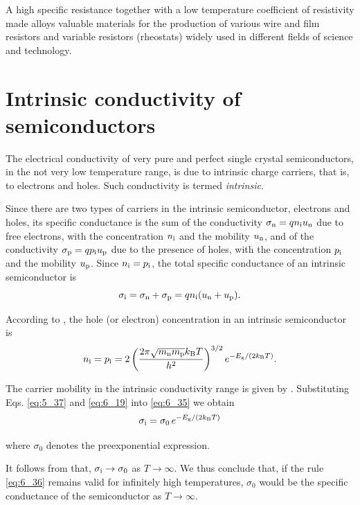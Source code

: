 A high specific resistance together with a low temperature coefficient of resistivity made alloys valuable materials for the production of various wire and film resistors and variable resistors (rheostats) widely used in different fields of science and technology.

\section{Intrinsic conductivity of semiconductors}\label{sec:56}

The electrical conductivity of very pure and perfect single crystal semiconductors, in the not very low temperature range, is due to intrinsic charge carriers, that is, to electrons and holes. Such conductivity is termed \textit{intrinsic}.

Since there are two types of carriers in the intrinsic semiconductor, electrons and holes, its specific conductance is the sum of the conductivity $\sigma_{\text{n}}=qn_{\text{i}}u_{\text{n}}$ due to free electrons, with the concentration $n_{\text{i}}$ and the mobility $u_{\text{n}}$, and of the conductivity $\sigma_{\text{p}}=qp_{\text{i}}u_{\text{p}}$ due to
the presence of holes, with the concentration $p_{\text{i}}$ and the mobility $u_{\text{p}}$. Since $n_{\text{i}}=p_{\text{i}}$, the total specific conductance of an intrinsic semiconductor is
\begin{equation}\label{eq:6_35}
	\sigma_{\text{i}} = \sigma_{\text{n}} + \sigma_{\text{p}} = q n_{\text{i}} (u_{\text{n}} + u_{\text{p}}).
\end{equation}

According to , the hole (or electron) concentration in an intrinsic semiconductor is
\begin{equation*}
	n_{\text{i}} = p_{\text{i}} = 2 \left(\frac{2 \pi \sqrt{m_{\text{n}} m_{\text{p}}} k_{\text{B}} T}{h^2}\right)^{3/2} e^{-E_{\text{g}}/(2k_{\text{B}}T)}.
\end{equation*}

\noindent
The carrier mobility in the intrinsic conductivity range is given by . Substituting Eqs. \eqref{eq:5_37} and \eqref{eq:6_19} into \eqref{eq:6_35} we obtain
\begin{equation}\label{eq:6_36}
	\sigma_{\text{i}} = \sigma_0\, e^{-E_{\text{g}}/(2k_{\text{B}}T)}
\end{equation}

\noindent
where $\sigma_0$ denotes the preexponential expression.

It follows from  that, $\sigma_{\text{i}}\to \sigma_0$ as $T\to\infty$. We thus conclude that, if the rule \eqref{eq:6_36} remains valid for infinitely high temperatures, $\sigma_0$ would be the specific conductance of the semiconductor as $T\to\infty$.

